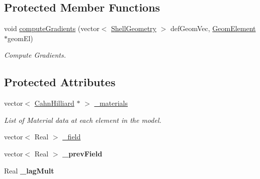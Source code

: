 \subsection*{Protected Member Functions}
\begin{DoxyCompactItemize}
\item 
\hypertarget{classvoom_1_1_phase_model_a950eae4a8ce7a092acf8711f24ba6b6e}{
void \hyperlink{classvoom_1_1_phase_model_a950eae4a8ce7a092acf8711f24ba6b6e}{computeGradients} (vector$<$ \hyperlink{classvoom_1_1_shell_geometry}{ShellGeometry} $>$ defGeomVec, \hyperlink{classvoom_1_1_geom_element}{GeomElement} $\ast$geomEl)}
\label{classvoom_1_1_phase_model_a950eae4a8ce7a092acf8711f24ba6b6e}

\begin{DoxyCompactList}\small\item\em Compute Gradients. \item\end{DoxyCompactList}\end{DoxyCompactItemize}
\subsection*{Protected Attributes}
\begin{DoxyCompactItemize}
\item 
\hypertarget{classvoom_1_1_phase_model_a4c98ae066d83a04ab5c7f01f82ba8b52}{
vector$<$ \hyperlink{classvoom_1_1_cahn_hilliard}{CahnHilliard} $\ast$ $>$ \hyperlink{classvoom_1_1_phase_model_a4c98ae066d83a04ab5c7f01f82ba8b52}{\_\-materials}}
\label{classvoom_1_1_phase_model_a4c98ae066d83a04ab5c7f01f82ba8b52}

\begin{DoxyCompactList}\small\item\em List of Material data at each element in the model. \item\end{DoxyCompactList}\item 
vector$<$ Real $>$ \hyperlink{classvoom_1_1_phase_model_ac2f861ab115758857f77583aae6aa051}{\_\-field}
\item 
\hypertarget{classvoom_1_1_phase_model_a82d9fc702336bb0ca1c9bf8bc22836ee}{
vector$<$ Real $>$ {\bfseries \_\-prevField}}
\label{classvoom_1_1_phase_model_a82d9fc702336bb0ca1c9bf8bc22836ee}

\item 
\hypertarget{classvoom_1_1_phase_model_a0a5b23c4899b3d7f7f23c2348e80a09e}{
Real {\bfseries \_\-lagMult}}
\label{classvoom_1_1_phase_model_a0a5b23c4899b3d7f7f23c2348e80a09e}

\end{DoxyCompactItemize}


